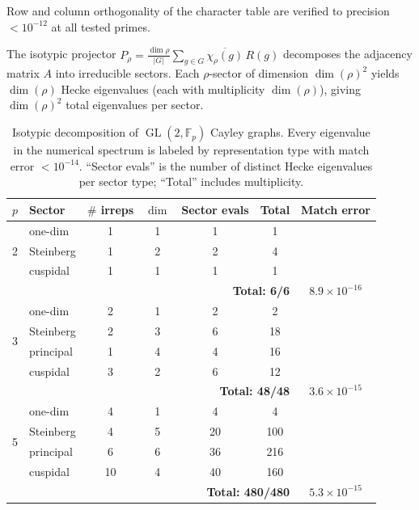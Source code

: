 \documentclass[12pt,reqno]{amsart}
\theoremstyle{plain}
\theoremstyle{definition}
\theoremstyle{remark}
\DeclareMathOperator{\GL}{GL}
\newcommand{\FF}{\mathbb{F}}
\begin{document}
Row and column orthogonality of the character table are verified to
precision $< 10^{-12}$ at all tested primes.

The isotypic projector
$P_\rho = \frac{\dim \rho}{|G|} \sum_{g \in G}
\overline{\chi_\rho(g)}\, R(g)$ decomposes the adjacency matrix $A$
into irreducible sectors.  Each $\rho$-sector of dimension
$\dim(\rho)^2$ yields $\dim(\rho)$ Hecke eigenvalues (each with
multiplicity $\dim(\rho)$), giving $\dim(\rho)^2$ total eigenvalues
per sector.

\begin{table}[ht]
\centering
\renewcommand{\arraystretch}{1.1}
\begin{tabular}{clccccc}
  \toprule
  $p$ & Sector & $\#$ irreps & $\dim$ & Sector evals
  & Total & Match error \\
  \midrule
  \multirow{3}{*}{2}
  & one-dim     & 1 & 1 &  1 & 1  & \\
  & Steinberg   & 1 & 2 &  2 & 4  & \\
  & cuspidal    & 1 & 1 &  1 & 1  & \\
  & \multicolumn{5}{r}{\textbf{Total: 6/6}} & $8.9 \times 10^{-16}$ \\
  \midrule
  \multirow{4}{*}{3}
  & one-dim     & 2 &  1 &  2 &  2 & \\
  & Steinberg   & 2 &  3 &  6 & 18 & \\
  & principal   & 1 &  4 &  4 & 16 & \\
  & cuspidal    & 3 &  2 &  6 & 12 & \\
  & \multicolumn{5}{r}{\textbf{Total: 48/48}} & $3.6 \times 10^{-15}$ \\
  \midrule
  \multirow{4}{*}{5}
  & one-dim     &  4 &  1 &   4 &   4 & \\
  & Steinberg   &  4 &  5 &  20 & 100 & \\
  & principal   &  6 &  6 &  36 & 216 & \\
  & cuspidal    & 10 &  4 &  40 & 160 & \\
  & \multicolumn{5}{r}{\textbf{Total: 480/480}} & $5.3 \times 10^{-15}$ \\
  \bottomrule
\end{tabular}
\caption{Isotypic decomposition of $\GL(2, \FF_p)$ Cayley graphs.
  Every eigenvalue in the numerical spectrum is labeled by
  representation type with match error $< 10^{-14}$.  ``Sector evals''
  is the number of distinct Hecke eigenvalues per sector type; ``Total''
  includes multiplicity.}
\label{tab:isotypic}
\end{table}
\end{document}
